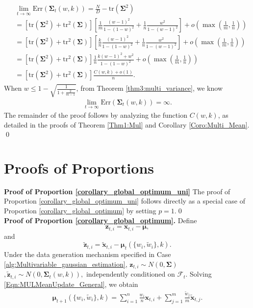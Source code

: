 \begin{align}
\begin{split}
&\lim_{t \to \infty} \mathrm{Err}(\mathbf{\Sigma}_t(w,k))=
\frac{N}{D}-\mathrm{tr}(\mathbf{\Sigma}^2)\\&=
[\mathrm{tr}(\mathbf{\Sigma}^2)+\mathrm{tr}^2(\mathbf{\Sigma})][\frac{1}{m}\frac{(w-1)^2}{1-(1-w)^2}+\frac{1}{n}\frac{w^2}{1-(w-1)^2} ]+o(\max(\frac{1}{m},\frac{1}{n})) \\
&=[\mathrm{tr}(\mathbf{\Sigma}^2)+\mathrm{tr}^2(\mathbf{\Sigma})][\frac{k}{n}\frac{(w-1)^2}{1-(1-w)^2}+\frac{1}{n}\frac{w^2}{1-(w-1)^2}]+o(\max(\frac{1}{m},\frac{1}{n}))\\&=[\mathrm{tr}(\mathbf{\Sigma}^2)+\mathrm{tr}^2(\mathbf{\Sigma})]\frac{1}{n}\frac{k(w-1)^2+w^2}{1-(1-w)^2}+o(\max{(\frac{1}{m},\frac{1}{n})})\\
&=[\mathrm{tr}(\mathbf{\Sigma}^2)+\mathrm{tr}^2(\mathbf{\Sigma})]\frac{C(w,k)+o(1)}{n}.
\end{split}
\end{align}
When $w\leq 1-\sqrt{\frac{1}{1+\frac{2}{m-1}}}$, from Theorem \ref{thm3:multi_variance}, we know 
\begin{align}
\lim_{t \to \infty}\mathrm{Err}(\mathbf{\Sigma}_t(w,k))=\infty.
\end{align}
The remainder of the proof follows by analyzing the function \( C(w, k) \), as detailed in the proofs of Theorem \ref{Thm1:Mul} and Corollary \ref{Coro:Multi_Mean}. \qed

\noindent
\section{Proofs of Proportions}
\textbf{Proof of Proportion \ref{corollary_global_optimum_uni}}
The proof of Proportion \ref{corollary_global_optimum_uni} follows directly as a special case of Proportion \ref{corollary_global_optimum} by setting $p=1$.\qed \\

\noindent
\textbf{Proof of Proportion \ref{corollary_global_optimum}.}
Define
\begin{equation*}
    \boldsymbol{z}_{t,i} = \boldsymbol{x}_{t,i} - \boldsymbol{\mu},
\end{equation*}
and
\begin{equation*}
    \widetilde{\boldsymbol{z}}_{t,i} = \widetilde{\boldsymbol{x}}_{t,i} - \boldsymbol{\mu}_{t}(\{w_i,\widetilde{w}_i\},k).
\end{equation*}
Under the data generation mechanism specified in Case \ref{alg:Multivariable_gaussian_estimation}, $
    \boldsymbol{z}_{t,i} \sim N(0, \mathbf{\Sigma})$
$,
    \widetilde{\boldsymbol{z}}_{t,i} \sim N(0, \mathbf{\Sigma}_{t}(w,k)),
$
independently conditioned on $\mathcal{F}_t$.
Solving \eqref{Eqn:MULMeanUpdate_General}, we obtain
\begin{align}
\label{general_analytic_form}
\boldsymbol{\mu}_{t+1}(\{w_i, \widetilde{w}_i\}, k) = \sum_{i=1}^{n} \frac{w_i}{n} \boldsymbol{x}_{t,i} + \sum_{j=1}^{m} \frac{\widetilde{w}_j}{m} \widetilde{\boldsymbol{x}}_{t,j}.
\end{align}


